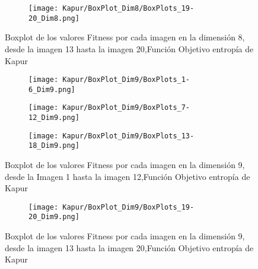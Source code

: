 \documentclass[conference]{IEEEtran}
\begin{document}
\begin{figure}
    \centering
    \begin{subfigure}{0.5\textwidth}
        \texttt{[image: Kapur/BoxPlot\_Dim8/BoxPlots\_19-20\_Dim8.png]}
        \vspace{-150pt} %
    \end{subfigure}
    \caption{Boxplot de los valores Fitness por cada imagen en la dimensión 8, desde la imagen 13 hasta la imagen 20,Función Objetivo entropía de Kapur}
    \label{fig:imagenes}    
\end{figure}
\begin{figure}
    \centering

    \begin{subfigure}{0.5\textwidth}
        \texttt{[image: Kapur/BoxPlot\_Dim9/BoxPlots\_1-6\_Dim9.png]}
    \end{subfigure}
    
    \begin{subfigure}{0.5\textwidth}
        \texttt{[image: Kapur/BoxPlot\_Dim9/BoxPlots\_7-12\_Dim9.png]}
    \end{subfigure}
         \begin{subfigure}{0.5\textwidth}
        \texttt{[image: Kapur/BoxPlot\_Dim9/BoxPlots\_13-18\_Dim9.png]}
    \end{subfigure}
    \caption{Boxplot de los valores Fitness por cada imagen en la dimensión 9, desde la Imagen 1 hasta la imagen 12,Función Objetivo entropía de Kapur}
\label{fig:imagenes}    
\end{figure}

\begin{figure}
    \centering
    \begin{subfigure}{0.5\textwidth}
        \texttt{[image: Kapur/BoxPlot\_Dim9/BoxPlots\_19-20\_Dim9.png]}
        \vspace{-1pt} %
    \end{subfigure}
    \caption{Boxplot de los valores Fitness por cada imagen en la dimensión 9, desde la imagen 13 hasta la imagen 20,Función Objetivo entropía de Kapur}
    \label{fig:imagenes}    
\end{figure}

\end{document}
